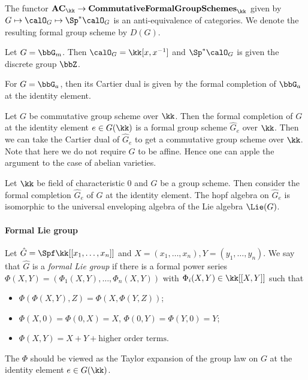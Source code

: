 \begin{theorem}
	The functor $\mathbf{AC}_\kk \to \mathbf{Commutative Formal Group Schemes}_\kk$ given by $G \mapsto \calO_G \mapsto \Sp^* \calO_G$ is an anti-equivalence of categories.
	We denote the resulting formal group scheme by $D(G)$.
\end{theorem}

\begin{example}
	Let $G = \bbG_m$.
	Then $\calO_G = \kk[x, x^{-1}]$ and $\Sp^* \calO_G$ is given the discrete group $\bbZ$.

	For $G = \bbG_a$, then its Cartier dual is given by the formal completion of $\bbG_a$ at the identity element.
\end{example}

Let $G$ be commutative group scheme over $\kk$.
Then the formal completion of $G$ at the identity element $e \in G(\kk)$ is a formal group scheme $\hat{G}_e$ over $\kk$.
Then we can take the Cartier dual of $\hat{G}_e$ to get a commutative group scheme over $\kk$.
Note that here we do not require $G$ to be affine.
Hence one can apple the argument to the case of abelian varieties.

\begin{theorem}
	Let $\kk$ be field of characteristic $0$ and $G$ be a group scheme.
	Then consider the formal completion $\hat{G}_e$ of $G$ at the identity element.
	The hopf algebra on $\hat{G}_e$ is isomorphic to the universal enveloping algebra of the Lie algebra $\Lie(G)$.
\end{theorem}

\paragraph{Formal Lie group}
Let $\hat{G} = \Spf \kk[[x_1, \ldots, x_n]]$ and $X = (x_1, \ldots, x_n), Y = (y_1, \ldots, y_n)$.
We say that $\hat{G}$ is a \emph{formal Lie group} if there is a formal power series $\Phi(X, Y) = (\Phi_1(X, Y), \ldots, \Phi_n(X, Y))$ with $\Phi_i(X, Y) \in \kk[[X, Y]]$ such that
\begin{itemize}
	\item $\Phi(\Phi(X, Y), Z) = \Phi(X, \Phi(Y, Z))$;
	\item $\Phi(X, 0) = \Phi(0, X) = X$, $\Phi(0,Y) = \Phi(Y, 0) = Y$;
	\item $\Phi(X, Y) = X + Y + \text{higher order terms}$.
\end{itemize}
The $\Phi$ should be viewed as the Taylor expansion of the group law on $G$ at the identity element $e \in G(\kk)$.


